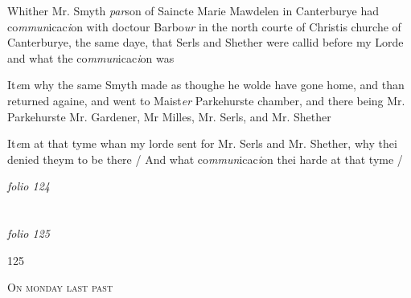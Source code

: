 \documentclass[12pt, a4paper]{book}
\begin{document}
		\ifthenelse{\isodd{\thepage}}
		{\reversemarginpar}
		{\normalmarginpar}
		Whither Mr. Smyth \textit{par}son of Saincte Marie Mawdelen in
            			Canterburye had co\textit{mmun}icac\textit{i}on with doctour Barbo\textit{ur} in the
            			north courte of Christis churche of Canterburye, the same
            			daye, that Serls and Shether were callid before my Lorde
 and what the co\textit{mmun}icac\textit{i}on was
            		
		\ifthenelse{\isodd{\thepage}}
		{\reversemarginpar}
		{\normalmarginpar}
		It\textit{e}m why the same Smyth made as thoughe he wolde have
            			gone home, and than returned againe, and went to Maist\textit{er}
            				Parkehurste chamber, and there being Mr. Parkehurste
 Mr. Gardener, Mr Milles, Mr. Serls, and Mr. Shether
            		
		\ifthenelse{\isodd{\thepage}}
		{\reversemarginpar}
		{\normalmarginpar}
		It\textit{e}m at that tyme whan my lorde sent for Mr. Serls and
 Mr. Shether, why thei denied theym to be there / And what
 co\textit{mmun}icac\textit{i}on thei harde at that tyme /

\dotfill
					

\textit{folio 124}


         \vspace{4cm}
         
\dotfill
					  \section*{}  \subsection*{}

\textit{folio 125}



\begin{flushright}{\color{Mahogany}125}\end{flushright}

				\begin{center} \begin{large} {\scshape On monday last past} \end{large} \end{center}
			
			
				
\end{document}
